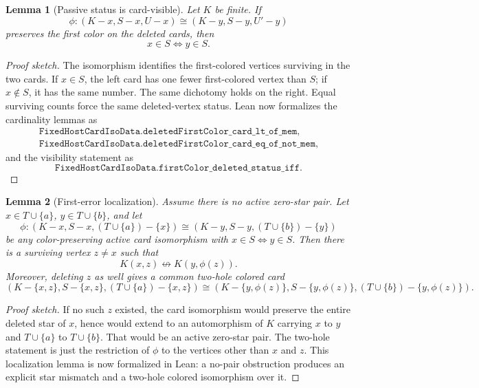 \documentclass[11pt]{article}
\newtheorem{lemma}{Lemma}
\begin{document}
\begin{lemma}[Passive status is card-visible]
Let \(K\) be finite.  If
\[
  \phi:(K-x,S-x,U-x)\cong(K-y,S-y,U'-y)
\]
preserves the first color on the deleted cards, then
\[
  x\in S\iff y\in S.
\]
\end{lemma}

\begin{proof}[Proof sketch]
The isomorphism identifies the first-colored vertices surviving in the two
cards.  If \(x\in S\), the left card has one fewer first-colored vertex than
\(S\); if \(x\notin S\), it has the same number.  The same dichotomy holds on
the right.  Equal surviving counts force the same deleted-vertex status.
Lean now formalizes the cardinality lemmas as
\[
\begin{array}{l}
\texttt{FixedHostCardIsoData.deletedFirstColor\_card\_lt\_of\_mem},\\
\texttt{FixedHostCardIsoData.deletedFirstColor\_card\_eq\_of\_not\_mem},
\end{array}
\]
and the visibility statement as
\[
  \texttt{FixedHostCardIsoData.firstColor\_deleted\_status\_iff}.
\]
\end{proof}

\begin{lemma}[First-error localization]
Assume there is no active zero-star pair.  Let \(x\in T\cup\{a\}\),
\(y\in T\cup\{b\}\), and let
\[
  \phi:(K-x,S-x,(T\cup\{a\})-\{x\})
  \cong
  (K-y,S-y,(T\cup\{b\})-\{y\})
\]
be any color-preserving active card isomorphism with \(x\in S\iff y\in S\).
Then there is a surviving vertex \(z\neq x\) such that
\[
  K(x,z)\not\leftrightarrow K(y,\phi(z)).
\]
Moreover, deleting \(z\) as well gives a common two-hole colored card
\[
  (K-\{x,z\},S-\{x,z\},(T\cup\{a\})-\{x,z\})
  \cong
  (K-\{y,\phi(z)\},S-\{y,\phi(z)\},(T\cup\{b\})-\{y,\phi(z)\}).
\]
\end{lemma}

\begin{proof}[Proof sketch]
If no such \(z\) existed, the card isomorphism would preserve the entire
deleted star of \(x\), hence would extend to an automorphism of \(K\) carrying
\(x\) to \(y\) and \(T\cup\{a\}\) to \(T\cup\{b\}\).  That would be an active
zero-star pair.  The two-hole statement is just the restriction of \(\phi\) to
the vertices other than \(x\) and \(z\).  This localization lemma is now
formalized in Lean: a no-pair obstruction produces an explicit star mismatch
and a two-hole colored isomorphism over it.
\end{proof}
\end{document}
